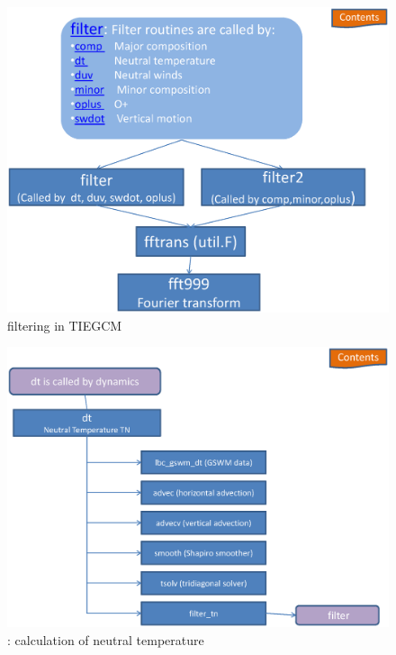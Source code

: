 \begin{figure}
  \centering
  \includegraphics[scale=0.7,angle=-90.]{./tex_plot/code_14.ps}
  \caption{filtering in TIEGCM}
   \label{fig:code_14}
\end{figure}
%
\begin{figure}
  \centering
  \includegraphics[scale=0.7,angle=-90.]{./tex_plot/code_15.ps}
  \caption{: calculation of neutral temperature}
   \label{fig:code_15}
\end{figure}
